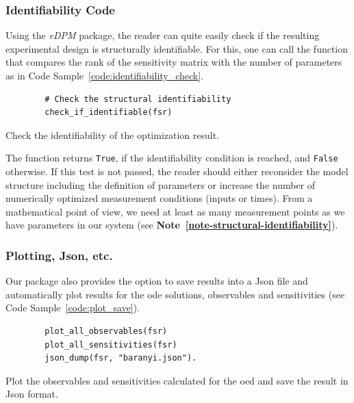 \documentclass[graybox]{svmult}
\begin{document}
\subsubsection{Identifiability Code}
Using the {\it eDPM} package, the reader can quite easily check if the resulting experimental design is structurally identifiable.
For this, one can call the function that compares the rank of the sensitivity matrix with the number of parameters as in Code Sample~\ref{code:identifiability_check}.
\begin{code}[h]
    \begin{verbatim}
        # Check the structural identifiability
        check_if_identifiable(fsr)
    \end{verbatim}
\caption{Check the identifiability of the optimization result.}
\label{code:identifiability_check}
\end{code}
The function returns \texttt{True}, if the identifiability condition is reached, and \texttt{False} otherwise.
If this test is not passed, the reader should either reconsider the model structure including the definition of parameters or increase the number of numerically optimized measurement conditions (inputs or times).
From a mathematical point of view, we need at least as many measurement points as we have parameters in our system (see \textbf{Note~\ref{note-structural-identifiability}}).
%
\subsubsection{Plotting, Json, etc.}
Our package also provides the option to save results into a Json file and automatically plot results for the ode solutions, observables and sensitivities (see Code Sample~\ref{code:plot_save}).
\begin{code}[h]
    \begin{verbatim}
        plot_all_observables(fsr)
        plot_all_sensitivities(fsr)
        json_dump(fsr, "baranyi.json").
    \end{verbatim}
\caption{Plot the observables and sensitivities calculated for the \ac{oed} and save the result in Json format.}
\label{code:plot_save}
\end{code}
%
%
%
\end{document}
